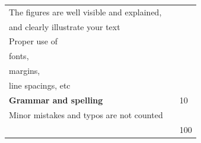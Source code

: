 \documentclass[11pt]{article} %
\begin{document}
\begin{table}
\begin{tabular}{|l | l| l|}
The figures are well visible and explained, &&\\
and clearly illustrate your text&&\\
Proper use of &&\\
fonts, &&\\
margins,&&\\
 line spacings, etc &&\\
\hline
{\bf Grammar and spelling} & & 10\\
Minor mistakes and typos are not counted&&\\                                                                                                                                                          
\hline
\hline
&& 100\\
\hline
\end{tabular}
\end{table}
\end{document}
